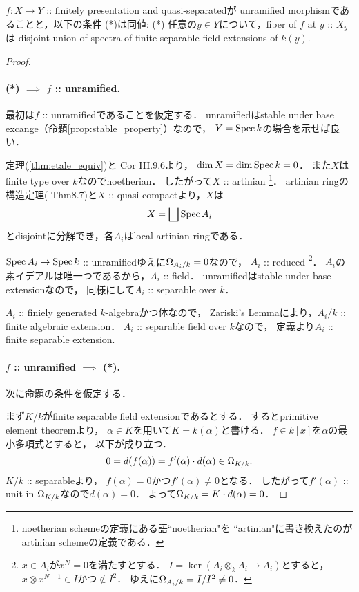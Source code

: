 \documentclass[a4paper]{jsarticle}
\begin{document}
\begin{Prop} \label{prop:unram_qfinite}
    $f \colon X \to Y$ :: finitely presentation and quasi-separatedが
    unramified morphismであることと，以下の条件 (*)は同値:
    (*)
    任意の$y \in Y$について，fiber of $f$ at $y$ :: $X_y$は
    disjoint union of spectra of finite separable field extensions of $k(y)$.
\end{Prop}
\begin{proof}
    \paragraph{(*) $\implies$ $f$ :: unramified.}
    最初は$f$ :: unramifiedであることを仮定する．
    unramifiedはstable under base excange（命題\ref{prop:stable_property}）なので，
    $Y=\operatorname{Spec} k$の場合を示せば良い．

    定理(\ref{thm:etale_equiv})と\cite{HarAG} Cor III.9.6より，
    $\dim X=\dim \operatorname{Spec} k=0$．
    また$X$はfinite type over $k$なのでnoetherian．
    したがって$X$ :: artinian
    \footnote{ noetherian schemeの定義にある語``noetherian"を
                ``artinian"に書き換えたのがartinian schemeの定義である． }．
    artinian ringの構造定理(\cite{Ati-Mac} Thm8.7)と$X$ :: quasi-compactより，$X$は
    \[ X=\bigsqcup \operatorname{Spec} A_i \]
    とdisjointに分解でき，各$A_i$はlocal artinian ringである．

    $\operatorname{Spec} A_i \to \operatorname{Spec} k$ :: unramifiedゆえに$\Omega_{A_i/k}=0$なので，
    $A_i$ :: reduced
    \footnote
    {
        $x \in A_i$が$x^{N}=0$を満たすとする．
        $I=\ker(A_i \otimes_k A_i \to A_i)$とすると，
        $x \otimes x^{N-1} \in I$かつ$\not \in I^2$．
        ゆえに$\Omega_{A_i/k}=I/I^2 \neq 0$．
    }．
    $A_i$の素イデアルは唯一つであるから，$A_i$ :: field．
    unramifiedはstable under base extensionなので，
    同様にして$A_i$ :: separable over $k$．

    $A_i$ :: finiely generated $k$-algebraかつ体なので，
    Zariski's Lemmaにより，$A_i/k$ :: finite algebraic extension．
    $A_i$ :: separable field over $k$なので，
    定義より$A_i$ :: finite separable extension.

    \paragraph{$f$ :: unramified $\implies$ (*).}
    次に命題の条件を仮定する．

    まず$K/k$がfinite separable field extensionであるとする．
    するとprimitive element theoremより，
    $\alpha \in K$を用いて$K=k(\alpha)$と書ける．
    $f \in k[x]$を$\alpha$の最小多項式とすると，
    以下が成り立つ．
    \[ 0=d(f(\alpha))=f'(\alpha) \cdot d(\alpha) \in \Omega_{K/k}. \]
    $K/k$ :: separableより，
    $f(\alpha)=0$かつ$f'(\alpha) \neq 0$となる．
    したがって$f'(\alpha)$ :: unit in $\Omega_{K/k}$なので$d(\alpha)=0$．
    よって$\Omega_{K/k}=K \cdot d(\alpha)=0$．


\end{proof}
\end{document}
